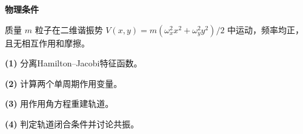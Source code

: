 \textbf{物理条件}\par 质量 \(m\) 粒子在二维谐振势 \(V(x,y)=m(\omega_x^2x^2+\omega_y^2y^2)/2\) 中运动，频率均正，且无相互作用和摩擦。
\par\noindent\textbf{(1)} 分离Hamilton–Jacobi特征函数。
\par\noindent\textbf{(2)} 计算两个单周期作用变量。
\par\noindent\textbf{(3)} 用作用角方程重建轨道。
\par\noindent\textbf{(4)} 判定轨道闭合条件并讨论共振。
